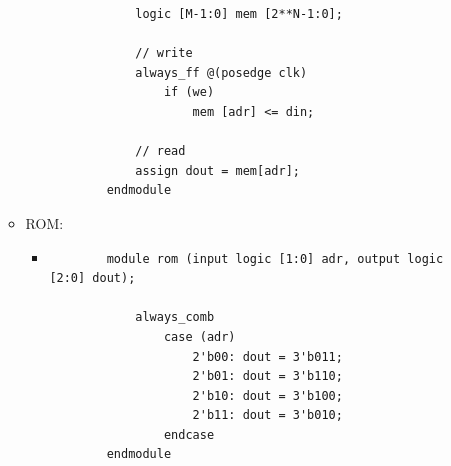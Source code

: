 \documentclass[11pt,a4paper]{article}
\begin{document}
\begin{itemize}
\begin{itemize}
\begin{itemize}
\begin{lstlisting}
			logic [M-1:0] mem [2**N-1:0];
			
			// write
			always_ff @(posedge clk)
				if (we)
					mem [adr] <= din;
			
			// read
			assign dout = mem[adr];
		endmodule
		\end{lstlisting}
		\end{itemize}
		
	\item ROM:
		\begin{itemize}
		\item[]
		\begin{lstlisting}
		module rom (input logic [1:0] adr, output logic [2:0] dout);
			
			always_comb
				case (adr)
					2'b00: dout = 3'b011;
					2'b01: dout = 3'b110;
					2'b10: dout = 3'b100;
					2'b11: dout = 3'b010;
				endcase
		endmodule
		\end{lstlisting}
		\end{itemize}
	\end{itemize}
	
	
\end{itemize}
\end{document}
